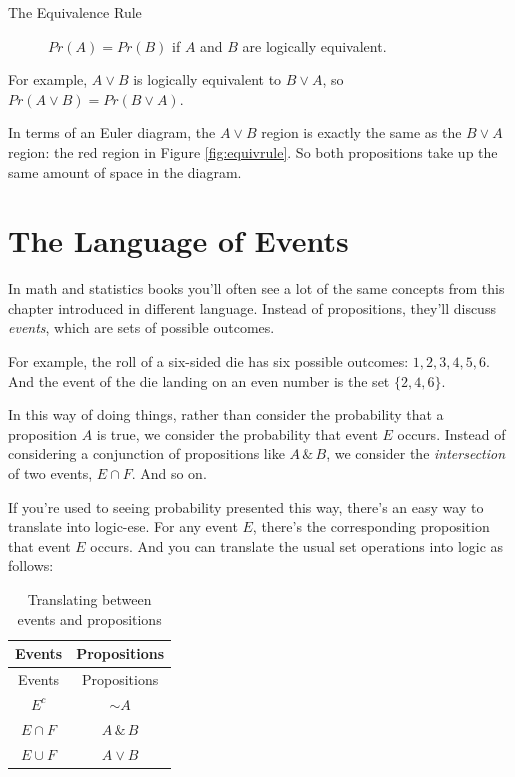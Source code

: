 \documentclass[justified]{tufte-book}
\newcommand{\p}{Pr}
\theoremstyle{definition}
\theoremstyle{definition}
\theoremstyle{definition}
\theoremstyle{definition}
\theoremstyle{remark}
\begin{document}
\begin{description}
\item[The Equivalence Rule]
\(\p(A) = \p(B)\) if \(A\) and \(B\) are logically equivalent.
\end{description}

For example, \(A \vee B\) is logically equivalent to \(B \vee A\), so \(\p(A \vee B) = \p(B \vee A)\).

In terms of an Euler diagram, the \(A \vee B\) region is exactly the same as the \(B \vee A\) region: the red region in Figure \ref{fig:equivrule}. So both propositions take up the same amount of space in the diagram.

\hypertarget{the-language-of-events}{%
\section{The Language of Events}\label{the-language-of-events}}

In math and statistics books you'll often see a lot of the same concepts from this chapter introduced in different language. Instead of propositions, they'll discuss \emph{events}, which are sets of possible outcomes.

For example, the roll of a six-sided die has six possible outcomes: \(1, 2, 3, 4, 5, 6\). And the event of the die landing on an even number is the set \(\{2, 4, 6\}\).

In this way of doing things, rather than consider the probability that a proposition \(A\) is true, we consider the probability that event \(E\) occurs. Instead of considering a conjunction of propositions like \(A \,\&\, B\), we consider the \emph{intersection} of two events, \(E \cap F\). And so on.

If you're used to seeing probability presented this way, there's an easy way to translate into logic-ese. For any event \(E\), there's the corresponding proposition that event \(E\) occurs. And you can translate the usual set operations into logic as follows:

\begin{longtable}[]{@{}cc@{}}
\caption{\label{tab:unnamed-chunk-53}Translating between events and propositions}\tabularnewline
\toprule
Events & Propositions \\
\midrule
\endfirsthead
\toprule
Events & Propositions \\
\midrule
\endhead
\(E^c\) & \(\sim\! A\) \\
\(E \cap F\) & \(A \,\&\, B\) \\
\(E \cup F\) & \(A \vee B\) \\
\bottomrule
\end{longtable}
\end{document}
